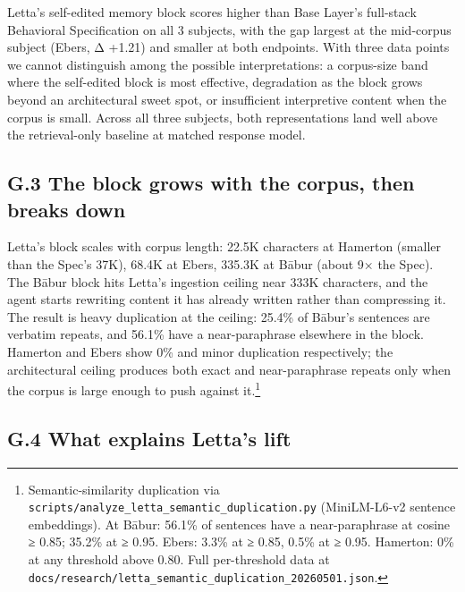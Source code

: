 Letta's self-edited memory block scores higher than Base Layer's
full-stack Behavioral Specification on all 3 subjects, with the gap
largest at the mid-corpus subject (Ebers, Δ +1.21) and smaller at both
endpoints. With three data points we cannot distinguish among the
possible interpretations: a corpus-size band where the self-edited block
is most effective, degradation as the block grows beyond an
architectural sweet spot, or insufficient interpretive content when the
corpus is small. Across all three subjects, both representations land
well above the retrieval-only baseline at matched response model.

\hypertarget{g.3-the-block-grows-with-the-corpus-then-breaks-down}{%
\subsection{G.3 The block grows with the corpus, then breaks
down}\label{g.3-the-block-grows-with-the-corpus-then-breaks-down}}

Letta's block scales with corpus length: 22.5K characters at Hamerton
(smaller than the Spec's 37K), 68.4K at Ebers, 335.3K at Bābur (about 9×
the Spec). The Bābur block hits Letta's ingestion ceiling near 333K
characters, and the agent starts rewriting content it has already
written rather than compressing it. The result is heavy duplication at
the ceiling: 25.4\% of Bābur's sentences are verbatim repeats, and
56.1\% have a near-paraphrase elsewhere in the block. Hamerton and Ebers
show 0\% and minor duplication respectively; the architectural ceiling
produces both exact and near-paraphrase repeats only when the corpus is
large enough to push against it.\footnote{Semantic-similarity
  duplication via
  \texttt{scripts/analyze\_letta\_semantic\_duplication.py}
  (MiniLM-L6-v2 sentence embeddings). At Bābur: 56.1\% of sentences have
  a near-paraphrase at cosine ≥ 0.85; 35.2\% at ≥ 0.95. Ebers: 3.3\% at
  ≥ 0.85, 0.5\% at ≥ 0.95. Hamerton: 0\% at any threshold above 0.80.
  Full per-threshold data at
  \texttt{docs/research/letta\_semantic\_duplication\_20260501.json}.}

\hypertarget{g.4-what-explains-lettas-lift}{%
\subsection{G.4 What explains Letta's
lift}\label{g.4-what-explains-lettas-lift}}


